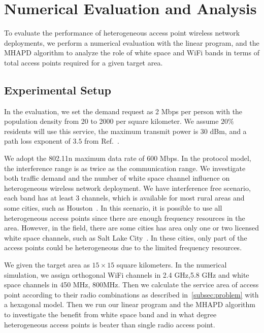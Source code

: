 \section{Numerical Evaluation and Analysis}
\label{sec:moaexperimentdesign}

To evaluate the performance of heterogeneous access point wireless network deployments,
we perform a numerical evaluation with the linear program, and the MHAPD algorithm to analyze the role
of white space and WiFi bands in terms of total access points required for a given target 
area.

\subsection{Experimental Setup}

In the evaluation, we set the demand request as 2 Mbps per person with the population
density from 20 to 2000 per square kilometer. We assume $20\%$ residents will use this
service, the maximum transmit power is 30 dBm, and a path loss exponent of $3.5$ from 
Ref.~\cite{meikle2012global}. 

We adopt the 802.11n maximum data rate of 600 Mbps. In the protocol model, the interference 
range is as twice as the communication range. We investigate both traffic demand and the 
number of white space channel influence on heterogeneous wireless network deployment. 
We have interference free scenario, each band has at least 3 channels, which is available for
most rural areas and some cities, such as Houston~\cite{googledatabase}. In this scenario,
it is possible to use all heterogeneous access points since there are enough frequency resources
in the area. However, in the field, there are some cities has area only one or two licensed 
white space channels, such as Salt Lake City~\cite{googledatabase}. In these cities, 
only part of the access points could be heterogeneous due to the limited frequency resources. 

We given the target area as $15\times 15$ square kilometers. In the numerical simulation, 
we assign orthogonal WiFi channels in 2.4 GHz,5.8 GHz and white space channels in 450 MHz, 
800MHz. Then we calculate the service area of access point according to their radio 
combinations as described in~\ref{subsec:problem} with a hexagonal model. Then we 
run our linear program and the MHAPD algorithm to investigate the benefit from white space band 
and in what degree heterogeneous access points is beater than single radio access point. 


